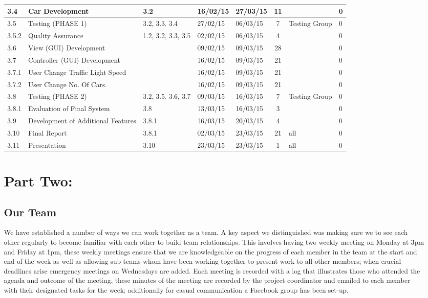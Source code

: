 \documentclass[a4paper,11pt]{article}
\begin{document}
\begin{table}[ht]
\begin{adjustwidth}{-2cm}{}
\begin{tabular}{|m{0.8cm}|m{6cm}|m{2.3cm}|m{1.3cm}|m{1.3cm}|c|m{2.6cm}|m{0.5cm}|}
			3.4 & Car Development & 3.2 & 16/02/15 & 27/03/15 & 11 &  & 0 \\\hline 
			3.5 & Testing (PHASE 1) & 3.2, 3.3, 3.4 & 27/02/15 & 06/03/15 & 7 & Testing Group & 0 \\\hline 
			3.5.2 & Quality Assurance  & 1.2, 3.2, 3.3, 3.5 & 02/02/15 & 06/03/15 & 4 &  & 0 \\\hline 
			3.6 & View (GUI) Development &  & 09/02/15 & 09/03/15 & 28 &  & 0 \\\hline 
			3.7 & Controller (GUI) Development  &  & 16/02/15 & 09/03/15 & 21 &  & 0 \\\hline 
			3.7.1 & User Change Traffic Light Speed  &  & 16/02/15 & 09/03/15 & 21 &  & 0 \\\hline 
			3.7.2 & User Change No. Of Cars.  &  & 16/02/15 & 09/03/15 & 21 &  & 0 \\\hline 
			3.8 & Testing (PHASE 2)  & 3.2, 3.5, 3.6, 3.7 & 09/03/15 & 16/03/15 & 7 & Testing Group & 0 \\\hline 
			3.8.1 & Evaluation of Final System  & 3.8 & 13/03/15 & 16/03/15 & 3 &  & 0 \\\hline 
			3.9 & Development of Additional Features & 3.8.1 & 16/03/15 & 20/03/15 & 4 &  & 0 \\\hline 
			3.10 & Final Report & 3.8.1 & 02/03/15 & 23/03/15 & 21 & all & 0 \\\hline 
			3.11 & Presentation & 3.10 & 23/03/15 & 23/03/15 & 1 & all & 0 \\ \hline 
		\end{tabular}
			\label{table:plan}
	\end{adjustwidth}
\end{table}

\section[short]{Part Two:}
\subsection{Our Team}%
We have established a number of ways we can work together as a team. A key aspect we distinguished was making sure we to see each other regularly to become familiar with each other to build team relationships. This involves having two weekly meeting on Monday at 3pm and Friday at 1pm, these weekly meetings ensure that we are knowledgeable on the progress of each member in the team at the start and end of the week as well as allowing sub teams whom have been working together to present work to all other members; when crucial deadlines arise emergency meetings on Wednesdays are added. Each meeting is recorded with a log that illustrates those who attended the agenda and outcome of the meeting, these minutes of the meeting are recorded by the project coordinator and emailed to each member with their designated tasks for the week; additionally for casual communication a Facebook group has been set-up.
\end{document}
